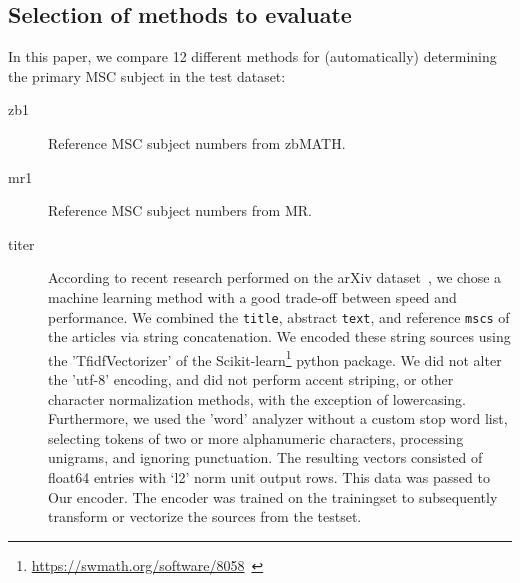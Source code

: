 \subsection{Selection of methods to evaluate}


In this paper, we compare 12 different methods for (automatically) determining the primary MSC subject in the test dataset:

\begin{description}
    \item[zb1] Reference MSC subject numbers from zbMATH.
  \item[mr1] Reference MSC subject numbers from MR.
  \item[titer]
  According to recent research performed on the arXiv dataset~\cite{Scharpf2020}, we chose a machine learning method with a good trade-off between speed and performance.
  We combined the \texttt{title}, abstract \texttt{text}, and reference \texttt{mscs} of the articles via string concatenation.
  We encoded these string sources using the 'TfidfVectorizer' of the Scikit-learn\footnote{\href{https://swmath.org/software/8058}{{https://swmath.org/software/8058}}~\cite{swSciKit}} python package.
  We did not alter the 'utf-8' encoding, and did not perform accent striping, or other character normalization methods, with the exception of lowercasing.
  Furthermore, we used the 'word' analyzer without a custom stop word list, selecting tokens of two or more alphanumeric characters, processing unigrams, and ignoring punctuation.
  The resulting vectors consisted of float64 entries with `l2' norm unit output rows.
  This data was passed to Our encoder.
  The encoder was trained on the trainingset to subsequently transform or vectorize the sources from the testset.

\end{description}
